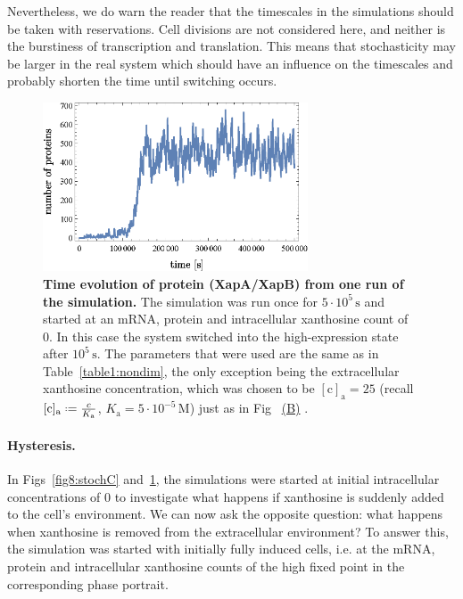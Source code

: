 \documentclass[10pt,letterpaper]{article}
\newcommand{\unit}[1]{\,\mathrm{#1}}
\newcommand{\n}[1]{\mathrm{#1}}
\newcommand*{\defeq}{\mathrel{\vcenter{\baselineskip0.5ex \lineskiplimit0pt
			\hbox{\scriptsize.}\hbox{\scriptsize.}}}%
	=}
\newcommand\subref[2]{%
	\def\myref{\getrefnumber{#1}}%
	\hyperref[#1]{\myref\mbox{#2}}%
}
\begin{document}
Nevertheless, we do warn the reader that the timescales in the simulations
should be taken with reservations. Cell divisions are not considered here,
and neither is the burstiness of transcription and translation. This means
that stochasticity may be larger in the real system which should have an
influence on the timescales and probably shorten the time until switching
occurs.

\begin{figure}%
	\centering
	\includegraphics[width=0.7\textwidth]{media/TimeEvolution.eps}
	\caption{{\bf Time evolution of protein (XapA/XapB) from one run of the simulation.}
		The simulation was run once for $5 \cdot 10^5 \unit{s}$ and started
		at an mRNA, protein and intracellular xanthosine count of 0. In this
		case the system switched into the high-expression state after $10^5
		\unit{s}$. The parameters that were used are the same as in
		Table~\ref{table1:nondim}, the only exception being the
		extracellular xanthosine concentration, which was chosen to be
		$\n{[c]_a} = 25$ (recall $\n{[c]_{a}} \defeq \frac{c}{K_{\n{a}}}$,
		$K_{\n{a}} = 5 \cdot 10^{-5} \unit{M}$) just as in
		Fig~\subref{fig8:stochC}{(B)}.}
	\label{fig:StochT}
\end{figure}

\paragraph*{Hysteresis.} 
In Figs~\ref{fig8:stochC} and~\ref{fig:StochT}, the simulations were started at initial
intracellular concentrations of 0 to investigate what happens if xanthosine
is suddenly added to the cell's environment. We can now ask the opposite
question: what happens when xanthosine is removed from the extracellular
environment? To answer this, the simulation was started with initially fully
induced cells, i.e. at the mRNA, protein and intracellular xanthosine counts
of the high fixed point in the corresponding phase portrait. 
\end{document}
